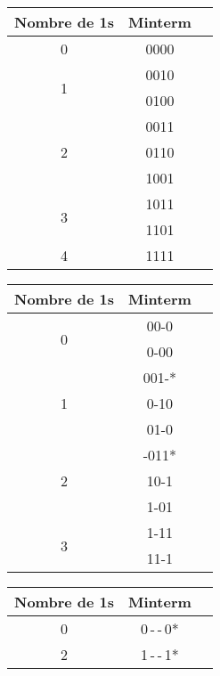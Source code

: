 \documentclass[12pt]{article}
\begin{document}
\vspace*{-24pt}\singlespacing\noindent
\begin{tabular}[t]{|c|c|c|}
	\hline
	\textbf{Nombre de 1s} & \textbf{Minterm} \\
	\hline
	0                     & 0000\checkmark   \\
	\hline
	\multirow{2}{*}{1}    & 0010\checkmark   \\
	                      & 0100\checkmark   \\
	\hline
	\multirow{3}{*}{2}    & 0011\checkmark   \\
	                      & 0110\checkmark   \\
	                      & 1001\checkmark   \\
	\hline
	\multirow{2}{*}{3}    & 1011\checkmark   \\
	                      & 1101\checkmark   \\
	\hline
	4                     & 1111\checkmark   \\
	\hline
\end{tabular}
\begin{tabular}[t]{|c|c|c|}
	\hline
	\textbf{Nombre de 1s} & \textbf{Minterm} \\
	\hline
	\multirow{2}{*}{0}    & 00-0\checkmark   \\
	                      & 0-00\checkmark   \\
	\hline
	\multirow{3}{*}{1}    & 001-*            \\
	                      & 0-10\checkmark   \\
	                      & 01-0\checkmark   \\
	\hline
	\multirow{3}{*}{2}    & -011*            \\
	                      & 10-1\checkmark   \\
	                      & 1-01\checkmark   \\
	\hline
	\multirow{2}{*}{3}    & 1-11\checkmark   \\
	                      & 11-1\checkmark   \\
	\hline
\end{tabular}
\begin{tabular}[t]{|c|c|c|}
	\hline
	\textbf{Nombre de 1s} & \textbf{Minterm} \\
	\hline
	0                     & 0\,-\,-\,0*      \\
	\hline
	2                     & 1\,-\,-\,1*      \\
	\hline
\end{tabular}\vspace*{12pt}
\doublespacing
\end{document}
